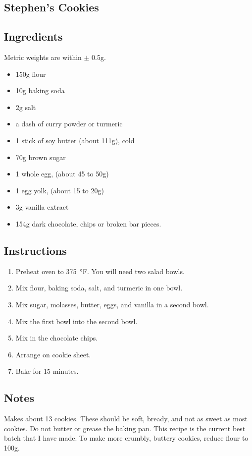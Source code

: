 \documentclass[12pt, letterpaper]{article}
\begin{document}
\thispagestyle{empty}
\twocolumn

\begin{flushleft}
\section*{Stephen's Cookies}
\subsection*{Ingredients}
Metric weights are within $\pm$ 0.5g.

\begin{itemize}
\item 150g flour
\item 10g baking soda
\item 2g salt
\item a dash of curry powder or turmeric
\item 1 stick of soy butter (about 111g), cold
\item 70g brown sugar
\item 1 whole egg, (about 45 to 50g)
\item 1 egg yolk, (about 15 to 20g)
\item 3g vanilla extract
\item 154g dark chocolate, chips or broken bar pieces.
\end{itemize}

\subsection*{Instructions}
\begin{enumerate}
\item Preheat oven to \SI{375}{\degree}F. You will need two salad bowls.
\item Mix flour, baking soda, salt, and turmeric in one bowl.
\item Mix sugar, molasses, butter, eggs, and vanilla in a second bowl.
\item Mix the first bowl into the second bowl.
\item Mix in the chocolate chips.
\item Arrange on cookie sheet.
\item Bake for 15 minutes.
\end{enumerate}


\subsection*{Notes}
Makes about 13 cookies. These should be soft, bready, and not as sweet as most cookies. Do not butter or grease the baking pan. This recipe is the current best batch that I have made. To make more crumbly, buttery cookies, reduce flour to 100g.


\end{flushleft}
\end{document}
